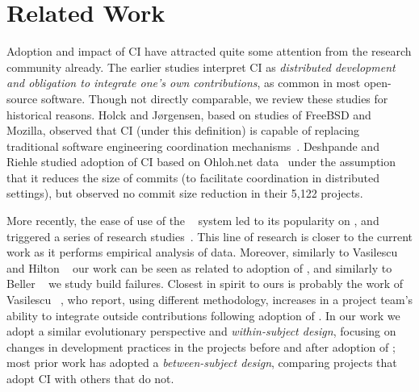 
\section{Related Work}
\label{sec:rw}

Adoption and impact of CI have attracted quite some attention from the research 
community already. 
The earlier studies interpret CI as \emph{distributed development and obligation 
to integrate one's own contributions}, as common in most open-source software.
Though not directly comparable, we review these studies for historical reasons.
Holck and J{\o}rgensen, based on studies of FreeBSD and Mozilla, observed that 
CI (under this definition) is capable of replacing traditional software engineering 
coordination mechanisms~\cite{HolckJ03}.  
Deshpande and Riehle studied adoption of CI based on Ohloh.net data~\cite{Deshpande2008}
under the assumption that it reduces the size of commits (to facilitate coordination
in distributed settings), but observed no commit size reduction in their 5,122 projects. 

More recently, the ease of use of the \Tvis~\cite{TravisCI} system led to its 
popularity on \GH, and triggered a series of research studies~\cite{era14, 
VasilescuYWDF15, yue2015wait, BellerGZ16, Hilton2016, Yu2016}.
This line of research is closer to the current work as it performs empirical
analysis of \Tvis data. Moreover, similarly to Vasilescu \etal~\cite{era14}
and Hilton \etal~\cite{Hilton2016} our work can be seen as related to adoption of \Tvis,
and similarly to Beller \etal~\cite{BellerGZ16} we study build failures.
Closest in spirit to ours is probably the work of Vasilescu \etal~\cite{VasilescuYWDF15},
who report, using different methodology, increases in a project team's ability 
to integrate outside contributions following adoption of \Tvis.
In our work we adopt a similar evolutionary perspective and \emph{within-subject 
design}, focusing on changes in development practices in the projects  before 
and after adoption of \Tvis;
most prior work has adopted a \emph{between-subject design}, comparing 
projects that adopt CI with others that do not.

